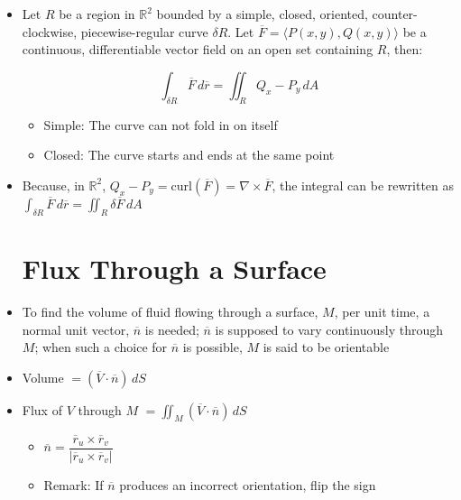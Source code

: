 \begin{itemize}
  \item Let $R$ be a region in $\mathbb{R}^2$ bounded by a simple, closed, oriented, counter-clockwise, piecewise-regular curve $\delta R$. Let $\overline{F}=\langle P(x,y), Q(x,y) \rangle$ be a continuous, differentiable vector field on an open set containing $R$, then:

    $$\int_{\delta R} \overline{F}\,d\overline{r}=\iint_R Q_x-P_y\,dA$$

    \begin{itemize}

      \item Simple: The curve can not fold in on itself

      \item Closed: The curve starts and ends at the same point

    \end{itemize}

  \item Because, in $\mathbb{R}^2$, $Q_x-P_y=\text{curl}(\overline{F})=\nabla \times \overline{F}$, the integral can be rewritten as $\displaystyle \int_{\delta R}\overline{F}\,d\overline{r}=\iint_R\delta\overline{F}\,dA$

    \section{Flux Through a Surface}

  \item To find the volume of fluid flowing through a surface, $M$, per unit time, a normal unit vector, $\overline{n}$ is needed; $\overline{n}$ is supposed to vary continuously through $M$; when such a choice for $\overline{n}$ is possible, $M$ is said to be orientable

  \item Volume $=(\overline{V}\cdot\overline{n})\,dS$

  \item Flux of $V$ through $M$ $=\displaystyle\iint_M (\overline{V}\cdot\overline{n})\,dS$

    \begin{itemize}

      \item $\overline{n}=\dfrac{\overline{r}_u\times\overline{r}_v}{|\overline{r}_u\times\overline{r}_v|}$

      \item Remark: If $\overline{n}$ produces an incorrect orientation, flip the sign


\end{itemize}
\end{itemize}
